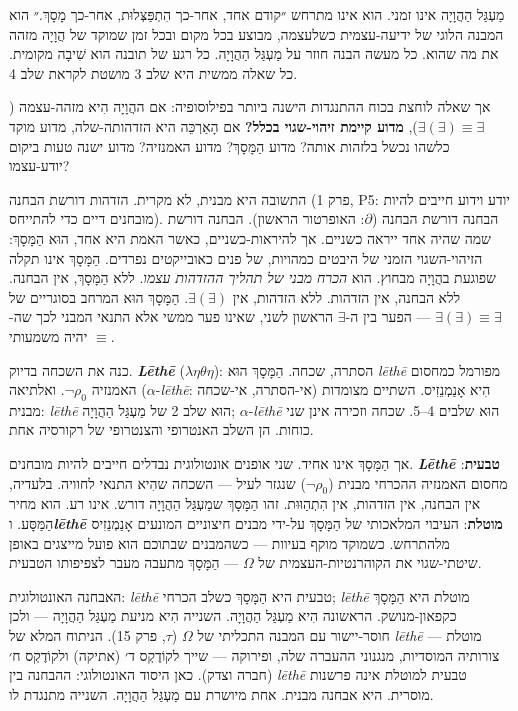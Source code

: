 \documentclass[10pt, openany, oneside]{book}
\begin{document}
\vspace{0.8em}

\noindent מַעְגַּל הַהֲוָיָה אינו זמני. הוא אינו מתרחש ״קודם אחד, אחר-כך הִתְפַּצְּלוּת, אחר-כך מָסָךְ.״ הוא המבנה הלוגי של ידיעה-עצמית כשלעצמה, מבוצע בכל מקום ובכל זמן שמוקד של הֲוָיָה מזהה את מה שהוא. כל מעשה הבנה חוזר על מַעְגַּל הַהֲוָיָה. כל רגע של תובנה הוא שִׁיבָה מקומית. כל שאלה ממשית היא שלב 3 מושטת לקראת שלב 4.

אך שאלה לוחצת בכוח ההתנגדות הישנה ביותר בפילוסופיה: אם ההֲוָיָה הִיא מזהה-עצמה ($\exists(\exists) \equiv \exists$), \textbf{מדוע קיימת זיהוי-שגוי בכלל?} אם הָאַרְכֵּה היא הזדהותה-שלה, מדוע מוקד כלשהו נכשל בלזהות אותה? מדוע הַמָּסָךְ? מדוע האמנזיה? מדוע ישנה טעות ביקום יודע-עצמו?

התשובה היא מבנית, לא מקרית. הזדהות דורשת הבחנה (פרק 1, P5: יודע וידוע חייבים להיות מובחנים דיים כדי להתייחס). הבחנה דורשת הבחנה ($\partial$: האופרטור הראשון). הבחנה דורשת שמה שהיה אחד ייראה כשניים. אך להיראות-כשניים, כאשר האמת היא אחד, הוּא הַמָּסָךְ: הזיהוי-השגוי הזמני של היבטים כמהויות, של פנים כאובייקטים נפרדים. הַמָּסָךְ אינו תקלה שפוגעת בהֲוָיָה מבחוץ. הוא \textit{הכרח מבני של תהליך ההזדהות עצמו}. ללא הַמָּסָךְ, אין הבחנה. ללא הבחנה, אין הזדהות. ללא הזדהות, אין $\exists(\exists)$. הַמָּסָךְ הוּא המרחב בסוגריים של $\exists(\exists) \equiv \exists$ — הפער בין ה-$\exists$ הראשון לשני, שאינו פער ממשי אלא התנאי המבני לכך שה-$\equiv$ יהיה משמעותי.

כנה את השכחה בדיוק. \textbf{\textit{Lēthē}} ($\lambda\eta\theta\eta$): הסתרה, שכחה. הַמָּסָךְ הוּא \textit{lēthē} מפורמל כמחסום האמנזיה $\neg\rho_0$. ואלתיאה ($\alpha$-\textit{lēthē}: אי-הסתרה, אי-שכחה) הִיא אָנַמְנֵזִיס. השתיים מצומדות מבנית: \textit{lēthē} הוּא שלב 2 של מַעְגַּל הַהֲוָיָה; $\alpha$-\textit{lēthē} הוּא שלבים 4–5. שכחה וזכירה אינן שני כוחות. הן השלב האנטרופי והצנטרופי של רקורסיה אחת.

אך הַמָּסָךְ אינו אחיד. שני אופנים אונטולוגית נבדלים חייבים להיות מובחנים. \textbf{\textit{Lēthē} טבעית}: מחסום האמנזיה ההכרחי מבנית ($\neg\rho_0$) שנגזר לעיל — השכחה שהִיא התנאי לחוויה. בלעדיה, אין הבחנה, אין הזדהות, אין הִתְהַוּוּת. זהו הַמָּסָךְ שמַעְגַּל הַהֲוָיָה דורש. אינו רע. הוא מחיר הַמַּסָּע. ו\textbf{\textit{lēthē} מוטלת}: העיבוי המלאכותי של הַמָּסָךְ על-ידי מבנים חיצוניים המונעים אָנַמְנֵזִיס מלהתרחש. כשמוקד מוקף בעיוות — כשהמבנים שבתוכם הוא פועל מייצגים באופן שיטתי-שגוי את הקוהרנטיות-העצמית של $\Omega$ — הַמָּסָךְ מתעבה מעבר לצפיפותו הטבעית.

האבחנה האונטולוגית: \textit{lēthē} טבעית היא הַמָּסָךְ כשלב הכרחי; \textit{lēthē} מוטלת היא הַמָּסָךְ כקפאון-מנושק. הראשונה הִיא מַעְגַּל הַהֲוָיָה. השנייה הִיא מניעת מַעְגַּל הַהֲוָיָה — ולכן חוסר-יישור עם המבנה התכליתי של $\Omega$ ($\tau$, פרק 15). הניתוח המלא של \textit{lēthē} מוטלת — צורותיה המוסדיות, מנגנוני ההעברה שלה, ופירוקה — שייך לקוֹדֶקְס ד׳ (אתיקה) ולקוֹדֶקְס ח׳ (חברה וצדק). כאן היסוד האונטולוגי: ההבחנה בין \textit{lēthē} טבעית למוטלת אינה פרשנות מוסרית. היא אבחנה מבנית. אחת מיושרת עם מַעְגַּל הַהֲוָיָה. השנייה מתנגדת לו.
\end{document}
